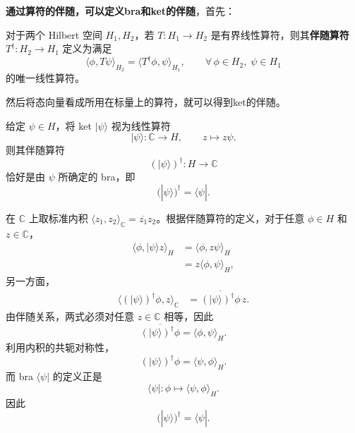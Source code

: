 \documentclass[UTF8,a4paper,11pt,openany]{ctexbook}
\begin{document}
\textbf{通过算符的伴随，可以定义bra和ket的伴随}，首先：

\begin{definition}[算符的伴随]
对于两个 Hilbert 空间 $H_1,H_2$，若 $T:H_1\to H_2$ 是有界线性算符，则其\textbf{伴随算符} $T^\dagger:H_2\to H_1$ 定义为满足
\begin{equation}
    \langle \phi,T\psi\rangle_{H_2}
    =
    \langle T^\dagger\phi,\psi\rangle_{H_1},
    \qquad
    \forall\,\phi\in H_2,\;\psi\in H_1
\end{equation}
的唯一线性算符。
\end{definition}
然后将态向量看成所用在标量上的算符，就可以得到ket的伴随。
\begin{proposition}
给定 $\psi\in H$，将 ket $|\psi\rangle$ 视为线性算符
\begin{equation}
    |\psi\rangle:\mathbb C\to H,
    \qquad
    z\longmapsto z\psi.
\end{equation}
则其伴随算符
\[
    (|\psi\rangle)^\dagger:H\to\mathbb C
\]
恰好是由 $\psi$ 所确定的 bra，即
\begin{equation}
    \boxed{
        (|\psi\rangle)^\dagger
        =
        \langle\psi|
    }.
\end{equation}
\end{proposition}

\begin{proofblock}
在 $\mathbb C$ 上取标准内积
$\langle z_1,z_2\rangle_{\mathbb C}=\overline{z_1}z_2$。根据伴随算符的定义，对于任意 $\phi\in H$ 和 $z\in\mathbb C$，
\begin{align}
    \langle\phi,|\psi\rangle z\rangle_H
    &=
    \langle\phi,z\psi\rangle_H
    \nonumber\\
    &=
    z\langle\phi,\psi\rangle_H,
\end{align}
另一方面，
\begin{align}
    \langle(|\psi\rangle)^\dagger\phi,z\rangle_{\mathbb C}
    &=
    \overline{(|\psi\rangle)^\dagger\phi}\,z.
\end{align}
由伴随关系，两式必须对任意 $z\in\mathbb C$ 相等，因此
\begin{equation}
    \overline{(|\psi\rangle)^\dagger\phi}
    =
    \langle\phi,\psi\rangle_H.
\end{equation}
利用内积的共轭对称性，
\begin{equation}
    (|\psi\rangle)^\dagger\phi
    =
    \langle\psi,\phi\rangle_H.
\end{equation}
而 bra $\langle\psi|$ 的定义正是
\[
    \langle\psi|:\phi\longmapsto\langle\psi,\phi\rangle_H.
\]
因此
\begin{equation}
    (|\psi\rangle)^\dagger
    =
    \langle\psi|.
\end{equation}
\end{proofblock}
\end{document}
